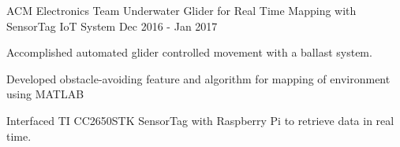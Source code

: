 \begin{cventries}
  \cventry
    {ACM Electronics Team}
    {Underwater Glider for Real Time Mapping with SensorTag IoT System}
    {}
    {Dec 2016 - Jan 2017}
    {
      \begin{cvitems}
        \item {Accomplished automated glider controlled movement with a ballast system.} 
        \item {Developed obstacle-avoiding feature and algorithm for mapping of environment using MATLAB}
        \item {Interfaced TI CC2650STK SensorTag with Raspberry Pi to retrieve data in real time.}
      \end{cvitems}
    }

\end{cventries}
